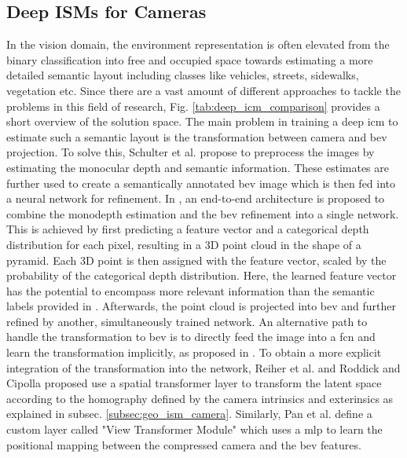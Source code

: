 \subsection{Deep ISMs for Cameras}
\label{subsec:deep_ism_camera}
In the vision domain, the environment representation is often elevated from the binary classification into free and occupied space towards estimating a more detailed semantic layout including classes like vehicles, streets, sidewalks, vegetation etc. Since there are a vast amount of different approaches to tackle the problems in this field of research, Fig. \ref{tab:deep_icm_comparison} provides a short overview of the solution space.
The main problem in training a deep \gls{icm} to estimate such a semantic layout is the transformation between camera and \gls{bev} projection. To solve this, Schulter et al. \cite{schulter2018learning} propose to preprocess the images by estimating the monocular depth and semantic information. These estimates are further used to create a semantically annotated \gls{bev} image which is then fed into a neural network for refinement. In \cite{philion2020lift}, an end-to-end architecture is proposed to combine the monodepth estimation and the \gls{bev} refinement into a single network. This is achieved by first predicting a feature vector and a categorical depth distribution for each pixel, resulting in a 3D point cloud in the shape of a pyramid. Each 3D point is then assigned with the feature vector, scaled by the probability of the categorical depth distribution. Here, the learned feature vector has the potential to encompass more relevant information than the semantic labels provided in \cite{schulter2018learning}. Afterwards, the point cloud is projected into \gls{bev} and further refined by another, simultaneously trained network. An alternative path to handle the transformation to \gls{bev} is to directly feed the image into a \gls{fcn} and learn the transformation implicitly, as proposed in \cite{mani2020monolayout,lu2019monocular}. To obtain a more explicit integration of the transformation into the network, Reiher et al. \cite{reiher2020sim2real} and Roddick and Cipolla \cite{roddick2020predicting} proposed use a spatial transformer layer \cite{jaderberg2015spatial} to transform the latent space according to the homography defined by the camera intrinsics and exterinsics as explained in subsec. \ref{subsec:geo_ism_camera}. Similarly, Pan et al. \cite{pan2020cross} define a custom layer called "View Transformer Module" which uses a \gls{mlp} to learn the positional mapping between the compressed camera and the \gls{bev} features.\\ 
